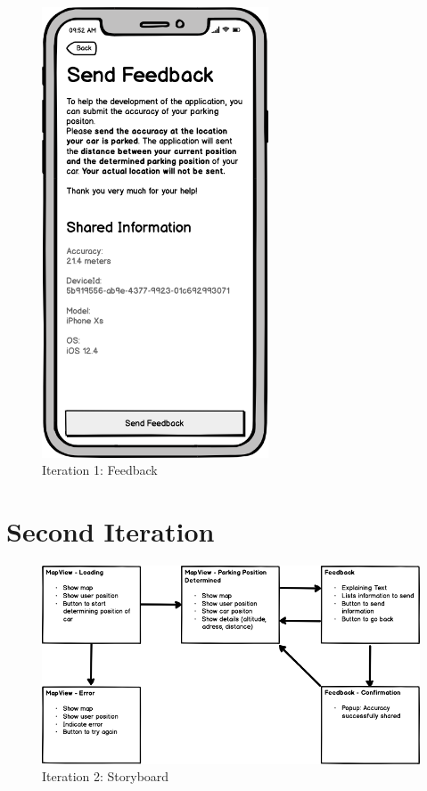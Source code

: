 \begin{figure}[H]
  \centering
  \begin{minipage}[b]{0.45\textwidth}
    \centering
    \includegraphics[width=0.6\textwidth]{images/UI/Iteration1-Feedback.png}
    \caption{Iteration 1: Feedback}
    \label{fig:i1-feedback}
  \end{minipage}
  \hfill
  \begin{minipage}[b]{0.45\textwidth}
    
  \end{minipage}
\end{figure}



\section*{Second Iteration}

\begin{figure}[H]
    \centering
    \includegraphics[width=\textwidth]{images/UI/Iteration2-Overview.png}
    \caption{Iteration 2: Storyboard}
    \label{fig:i2story}
\end{figure}

